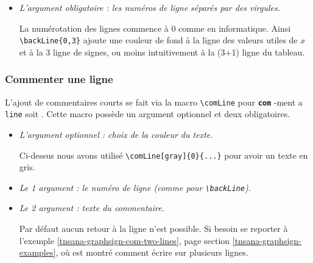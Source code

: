 \documentclass[12pt,a4paper]{book}
\makeatletter
\newcommand\env[1]{\texttt{#1}}
\newcommand\macro[1]{\env{\textbackslash{}#1}}
\theoremstyle{definition}
\newcommand\whyprefix[2]{%
	\textbf{\prefix{#1}}-#2%
}
\newcommand\prefix[1]{%
	\texttt{#1}%
}
\newcommand\inenglish{\@ifstar{\@inenglish@star}{\@inenglish@no@star}}
\newcommand\@inenglish@star[1]{%
	\emph{\og #1 \fg}%
}
\newcommand\@inenglish@no@star[1]{%
	\@inenglish@star{#1} en anglais%
}
\makeatother
\begin{document}
{{\begin{itemize}[label=\small\textbullet, itemsep=.25em]
          \smallskip
          
          Ci-dessus nous avons utilisé la couleur par défaut qui est  \verb#gray!30#.


    \medskip
    \item \textit{L'argument obligatoire : les numéros de ligne séparés par des virgules.}
          
          \smallskip
          
          La numérotation des lignes commence à $0$ comme en informatique. Ainsi \verb#\backLine{0,3}# ajoute une couleur de fond à la ligne des valeurs utiles de $x$ et à la 3\ieme{} ligne de signes, ou moins intuitivement à la (3+1)\ieme{} ligne du tableau.
\end{itemize}





\subsubsection{Commenter une ligne} \label{tnsana-comment-tab-sign}

L'ajout de commentaires courts se fait via la macro \macro{comLine} pour \whyprefix{com}{ment a} \prefix{line} soit \inenglish{commenter une ligne}.
Cette macro possède un argument optionnel et deux obligatoires.

\begin{itemize}[label=\small\textbullet, itemsep=.25em]
    \item \textit{L'argument optionnel : choix de la couleur du texte.}
          
          \smallskip
          
          Ci-dessus nous avons utilisé \verb#\comLine[gray]{0}{...}# pour avoir un texte en gris.


    \item \textit{Le 1\ier{} argument : le numéro de ligne \emph{(comme pour \macro{backLine})}.}


    \item \textit{Le 2\ieme{} argument : texte du commentaire.}
          
          \smallskip
          
          Par défaut aucun retour à la ligne n'est possible.
          Si besoin se reporter à l'exemple \ref{tnsana-graphsign-com-two-lines},  page \pageref{tnsana-graphsign-com-two-lines} section \ref{tnsana-graphsign-examples}, où est montré comment écrire sur plusieurs lignes.
\end{itemize}


}}
\end{document}
